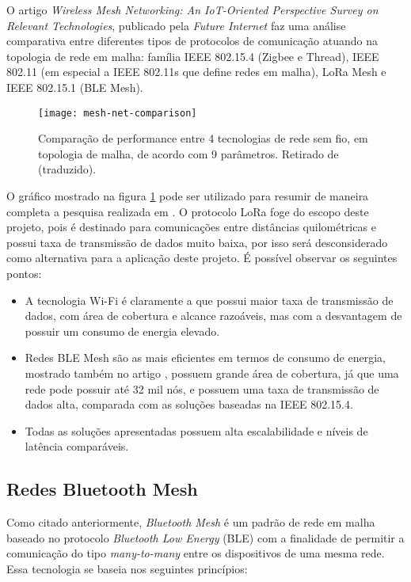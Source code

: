 \documentclass[../monografia.tex]{subfiles}
\begin{document}
O artigo \textit{Wireless Mesh Networking: An IoT-Oriented Perspective Survey on Relevant Technologies}, publicado pela \textit{Future Internet}\cite{mesh-net-comparison} faz uma análise comparativa entre diferentes tipos de protocolos de comunicação atuando na topologia de rede em malha: família IEEE 802.15.4 (Zigbee e Thread), IEEE 802.11 (em especial a IEEE 802.11s que define redes em malha), LoRa Mesh e IEEE 802.15.1 (BLE Mesh).

\begin{figure}[h!]
\centering
	\texttt{[image: mesh-net-comparison]}
	\caption{
		Comparação de performance entre 4 tecnologias de rede sem fio, em topologia de malha, de acordo com 9 parâmetros. Retirado de \cite{mesh-net-comparison} (traduzido).
	}
	\label{fig:Comparação redes mesh}
\end{figure}

O gráfico mostrado na figura \ref{fig:Comparação redes mesh} pode ser utilizado para resumir de maneira completa a pesquisa realizada em \cite{mesh-net-comparison}. O protocolo LoRa foge do escopo deste projeto, pois é destinado para comunicações entre distâncias quilométricas e possui taxa de transmissão de dados muito baixa, por isso será desconsiderado como alternativa para a aplicação deste projeto. É possível observar os seguintes pontos:

\begin{itemize}
	\item A tecnologia Wi-Fi é claramente a que possui maior taxa de transmissão de dados, com área de cobertura e alcance razoáveis, mas com a desvantagem de possuir um consumo de energia elevado.
	\item Redes BLE Mesh são as mais eficientes em termos de consumo de energia, mostrado também no artigo \cite{zigbee-ble-power}, possuem grande área de cobertura, já que uma rede pode possuir até 32 mil nós\cite{BLE-mesh}, e possuem uma taxa de transmissão de dados alta, comparada com as soluções baseadas na IEEE 802.15.4.
	\item Todas as soluções apresentadas possuem alta escalabilidade e níveis de latência comparáveis.
\end{itemize}


\subsection{Redes Bluetooth Mesh}

Como citado anteriormente, \textit{Bluetooth Mesh} é um padrão de rede em malha baseado no protocolo \textit{Bluetooth Low Energy} (BLE) com a finalidade de permitir a comunicação do tipo \textit{many-to-many} entre os dispositivos de uma mesma rede. Essa tecnologia se baseia nos seguintes princípios:
\end{document}
